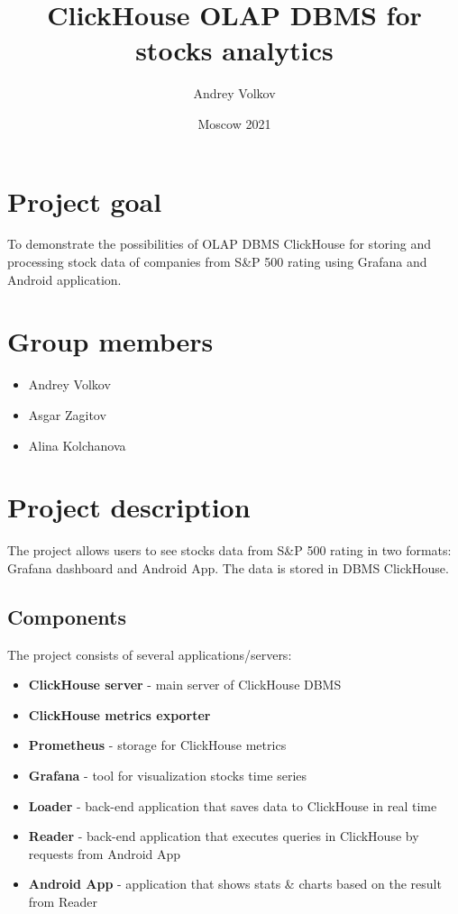\documentclass{article}
\title{ClickHouse OLAP DBMS for stocks analytics}
\author{Andrey Volkov}
\date{Moscow 2021}
\begin{document}
\maketitle

\section{Project goal}

To demonstrate the possibilities of OLAP DBMS ClickHouse for storing and processing stock data of companies from S\&P 500 rating using Grafana and Android application.

\section{Group members}
\begin{itemize}
    \item Andrey Volkov
    \item Asgar Zagitov
    \item Alina Kolchanova
\end{itemize}

\section{Project description}

The project allows users to see stocks data from S\&P 500 rating in two formats: Grafana dashboard and Android App. The data is stored in DBMS ClickHouse.

\subsection{Components}

The project consists of several applications/servers:

\begin{itemize}
    \item \textbf{ClickHouse server} - main server of ClickHouse DBMS
    \item \textbf{ClickHouse metrics exporter}
    \item \textbf{Prometheus} - storage for ClickHouse metrics
    \item \textbf{Grafana} - tool for visualization stocks time series
    \item \textbf{Loader} - back-end application that saves data to ClickHouse in real time
    \item \textbf{Reader} - back-end application that executes queries in ClickHouse by requests from Android App
    \item \textbf{Android App} - application that shows stats \& charts based on the result from Reader
\end{itemize}
\end{document}
